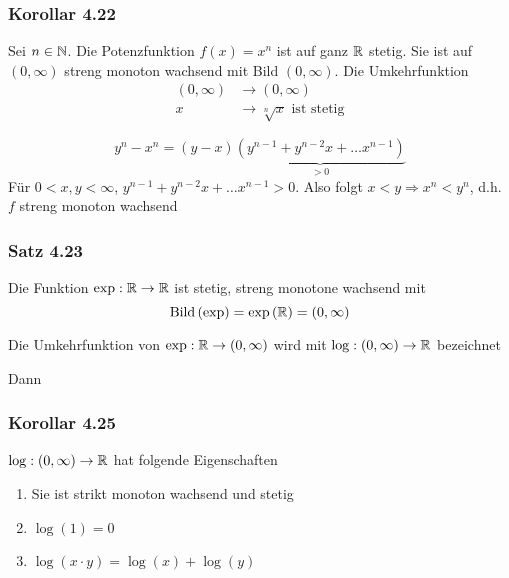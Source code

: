 \subsubsection*{Korollar 4.22}
Sei $n\in\mathbb{N}$. Die Potenzfunktion $f(x)=x^n$ ist auf ganz $\mathbb{R}$ stetig. Sie ist auf $\left( 0,\infty\right)$ streng monoton wachsend mit Bild $\left( 0,\infty\right)$. Die Umkehrfunktion 
\begin{align*}
\left( 0,\infty\right)&\to\left( 0,\infty\right)\\
x&\to\sqrt[n]{x}\text{ ist stetig}
\end{align*}

\begin{beweis}{}
\[{y^n} - {x^n} = \left( {y - x} \right)\underbrace {\left( {{y^{n - 1}} + {y^{n - 2}}x +  \ldots {x^{n - 1}}} \right)}_{ > 0}\]
Für $0<x,y<\infty$, ${y^{n - 1}} + {y^{n - 2}}x +  \ldots {x^{n - 1}}>0$.
Also folgt $x<y\Rightarrow x^n<y^n$, d.h. $f$ streng monoton wachsend
\end{beweis}

\subsubsection*{Satz 4.23}
Die Funktion $\exp:\mathbb{R}\to\mathbb{R}$ ist stetig, streng monotone wachsend mit 
\[ \operatorname{Bild}\left( \exp\right)=\exp\left( \mathbb{R}\right)=\left( 0,\infty\right)\]

\begin{definition}{4.24}
Die Umkehrfunktion von $\exp:\mathbb{R}\to\left( 0,\infty\right)$ wird mit $\log:\left( 0,\infty\right)\to\mathbb{R}$ bezeichnet
\end{definition}
Dann

\subsubsection*{Korollar 4.25}
$\log:\left( 0,\infty\right)\to\mathbb{R}$ hat folgende Eigenschaften
\begin{enumerate}
\item Sie ist strikt monoton wachsend und stetig
\item $\log(1)=0$
\item $\log\left( x\cdot y\right)=\log(x)+\log\left( y\right)$
\end{enumerate}

